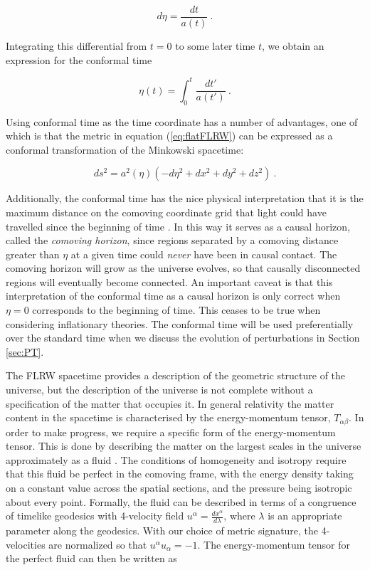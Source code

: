 \documentclass[10pt,letterpaper,final]{iopart}
\numberwithin{equation}{subsection}
\def\ni{\noindent}
\begin{document}
\begin{equation}\label{eq:conformaltimediff}
d\eta = \frac{dt}{a(t)} \ .
\end{equation}

\ni Integrating this differential from $t = 0$ to some later time $t$, we obtain an expression for the conformal time

\begin{equation}
\eta(t) = \int_0^t \frac{dt'}{a(t')} \ .
\end{equation}

\ni Using conformal time as the time coordinate has a number of advantages, one of which is that the metric in equation (\ref{eq:flatFLRW}) can be expressed as a conformal transformation of the Minkowski spacetime:

\begin{equation}
ds^2 = a^2(\eta) \left(-d\eta^2 + dx^2 + dy^2 + dz^2 \right) \ .
\end{equation}

\ni Additionally, the conformal time has the nice physical interpretation that it is the maximum distance on the comoving coordinate grid that light could have travelled since the beginning of time \cite{Dodelson}\cite{Baumann}. In this way it serves as a causal horizon, called the \emph{comoving horizon}, since regions separated by a comoving distance greater than $\eta$ at a given time could \emph{never} have been in causal contact. The comoving horizon will grow as the universe evolves, so that causally disconnected regions will eventually become connected. An important caveat is that this interpretation of the conformal time as a causal horizon is only correct when $\eta=0$ corresponds to the beginning of time. This ceases to be true when considering inflationary theories. The conformal time will be used preferentially over the standard time when we discuss the evolution of perturbations in Section \ref{sec:PT}.

The FLRW spacetime provides a description of the geometric structure of the universe, but the description of the universe is not complete without a specification of the matter that occupies it. In general relativity the matter content in the spacetime is characterised by the energy-momentum tensor, $T_{\alpha\beta}$. In order to make progress, we require a specific form of the energy-momentum tensor. This is done by describing the matter on the largest scales in the universe approximately as a fluid \cite{Carroll}\cite{Dodelson}\cite{Baumann}. The conditions of homogeneity and isotropy require that this fluid be perfect in the comoving frame, with the energy density taking on a constant value across the spatial sections, and the pressure being isotropic about every point. Formally, the fluid can be described in terms of a congruence of timelike geodesics with 4-velocity field $u^\alpha = \frac{dx^\alpha}{d\lambda}$, where $\lambda$ is an appropriate parameter along the geodesics. With our choice of metric signature, the 4-velocities are normalized so that $u^\alpha u_\alpha = -1$. The energy-momentum tensor for the perfect fluid can then be written as 
\end{document}
